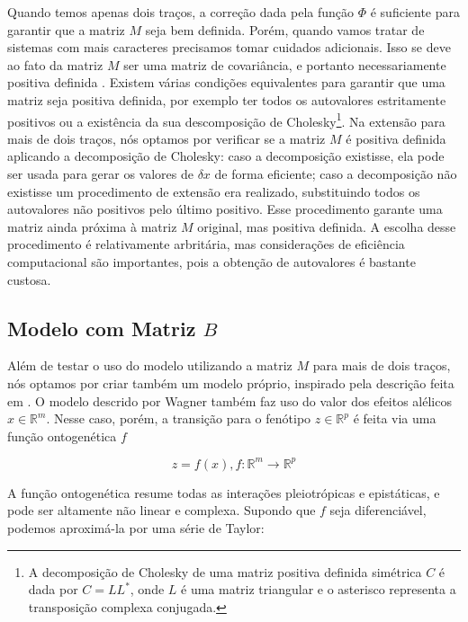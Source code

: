 Quando temos apenas dois traços, a correção dada pela função $\Phi$ é
suficiente para garantir que a matriz $M$ seja bem definida.
Porém, quando vamos tratar de sistemas com mais caracteres precisamos
tomar cuidados adicionais.
Isso se deve ao fato da matriz $M$ ser uma matriz de covariância, e
portanto necessariamente positiva definida \citep{Anderson1984}.
Existem várias condições equivalentes para garantir que uma matriz seja
positiva definida, por exemplo ter todos os autovalores estritamente
positivos ou a existência da sua descomposição de Cholesky\footnote{A
   decomposição de Cholesky de uma matriz positiva definida simétrica
$C$ é dada por $C=LL^*$, onde $L$ é uma matriz triangular e o asterisco
representa a transposição complexa conjugada.}.
Na extensão para mais de dois traços, nós optamos por verificar se a
matriz $M$ é positiva definida aplicando a decomposição de Cholesky:
caso a decomposição existisse, ela pode ser usada para gerar os valores
de $\delta x$ de forma eficiente; caso a decomposição não existisse um
procedimento de extensão \citep{Marroig2011b} era realizado,
substituindo todos os autovalores não positivos pelo último positivo.
Esse procedimento garante uma matriz ainda próxima à matriz $M$
original, mas positiva definida.
A escolha desse procedimento é relativamente arbritária, mas
considerações de eficiência computacional são importantes, pois a
obtenção de autovalores é bastante custosa.

\subsection{Modelo com Matriz $B$}\label{cap2:mem:ModelB}

Além de testar o uso do modelo utilizando a matriz $M$ para mais de dois
traços, nós optamos por criar também um modelo próprio, inspirado pela
descrição feita em \cite{Wagner1984}.
O modelo descrido por Wagner também faz uso do valor dos efeitos
alélicos $x \in \mathbb{R}^m$.
Nesse caso, porém, a transição para o fenótipo $z \in \mathbb{R}^p$ é
feita via uma função ontogenética $f$

\begin{equation}
z = f(x), f:\mathbb{R}^m \rightarrow \mathbb{R}^{p}
\end{equation}

A função ontogenética resume todas as interações pleiotrópicas e
epistáticas, e pode ser altamente não linear e complexa.
Supondo que $f$ seja diferenciável, podemos aproximá-la por uma série de
Taylor:

